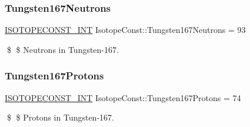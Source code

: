 \subsubsection{\texorpdfstring{Tungsten167\+Neutrons}{Tungsten167Neutrons}}
{\footnotesize\ttfamily \mbox{\hyperlink{group___isotope_const-_macros_ga5f18360b3e99483a35c32d789e62621c}{I\+S\+O\+T\+O\+P\+E\+C\+O\+N\+S\+T\+\_\+\+I\+NT}} Isotope\+Const\+::\+Tungsten167\+Neutrons = 93}

\$ \$ Neutrons in Tungsten-\/167. \mbox{\label{group___isotope_const-_tungsten-_w167_gaff0d23693a14f9124a00f765e703e770}} 
\subsubsection{\texorpdfstring{Tungsten167\+Protons}{Tungsten167Protons}}
{\footnotesize\ttfamily \mbox{\hyperlink{group___isotope_const-_macros_ga5f18360b3e99483a35c32d789e62621c}{I\+S\+O\+T\+O\+P\+E\+C\+O\+N\+S\+T\+\_\+\+I\+NT}} Isotope\+Const\+::\+Tungsten167\+Protons = 74}

\$ \$ Protons in Tungsten-\/167. 